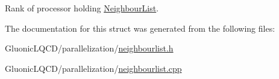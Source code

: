 Rank of processor holding \mbox{\hyperlink{struct_neighbour_list}{Neighbour\+List}}. 



The documentation for this struct was generated from the following files\+:\begin{DoxyCompactItemize}
\item 
Gluonic\+L\+Q\+C\+D/parallelization/\mbox{\hyperlink{neighbourlist_8h}{neighbourlist.\+h}}\item 
Gluonic\+L\+Q\+C\+D/parallelization/\mbox{\hyperlink{neighbourlist_8cpp}{neighbourlist.\+cpp}}\end{DoxyCompactItemize}
